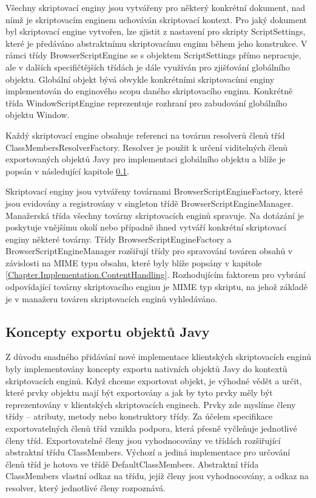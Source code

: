 Všechny skriptovací enginy jsou vytvářeny pro některý konkrétní dokument, nad nímž je skriptovacím enginem uchováván skriptovací kontext. Pro jaký dokument byl skriptovací engine vytvořen, lze zjistit z nastavení pro skripty ScriptSettings, které je předáváno abstraktnímu skriptovacímu enginu během jeho konstrukce. V rámci třídy BrowserScriptEngine se s objektem ScriptSettings přímo nepracuje, ale v dalších specifičtějších třídách je dále využíván pro zjišťování globálního objektu. Globální objekt bývá obvykle konkrétními skriptovacími enginy implementován do enginového scopu daného skriptovacího enginu. Konkrétně třída WindowScriptEngine reprezentuje rozhraní pro zabudování globálního objektu Window.

Každý skriptovací engine obsahuje referenci na továrnu resolverů členů tříd ClassMembersResolverFactory. Resolver je použit k určení viditelných členů exportovaných objektů Javy pro implementaci globálního objektu a blíže je popsán v následující kapitole \ref{Chapter.Implementation.ExportConcepts}. 

Skriptovací enginy jsou vytvářeny továrnami BrowserScriptEngineFactory, které jsou evidovány a registrovány v singleton třídě BrowserScriptEngineManager. Manažerská třída všechny továrny skriptovacích enginů spravuje. Na dotázání je poskytuje vnějšímu okolí nebo případně ihned vytváří konkrétní skriptovací enginy některé továrny. Třídy BrowserScriptEngineFactory a BrowserScriptEngineManager rozšiřují třídy pro spravování továren obsahů v závislosti na MIME typu obsahu, které byly blíže popsány v kapitole \ref{Chapter.Implementation.ContentHandling}. Rozhodujícím faktorem pro vybrání odpovídající továrny skriptovacího enginu je MIME typ skriptu, na jehož základě je v manažeru továren skriptovacích enginů vyhledáváno.

\subsection{Koncepty exportu objektů Javy}
\label{Chapter.Implementation.ExportConcepts}

Z důvodu snadného přidávání nové implementace klientských skriptovacích enginů byly implementovány koncepty exportu nativních objektů Javy do kontextů skriptovacích enginů. Když chceme exportovat objekt, je výhodné vědět a určit, které prvky objektu mají být exportovány a jak by tyto prvky měly být reprezentovány v klientských skriptovacích enginech. Prvky zde myslíme členy třídy -- atributy, metody nebo konstruktory třídy. Za účelem specifikace exportovatelných členů tříd vznikla podpora, která přesně vyčleňuje jednotlivé členy tříd. Exportovatelné členy jsou vyhodnocovány ve třídách rozšiřující abstraktní třídu ClassMembers. Výchozí a jediná implementace pro určování členů tříd je hotova ve třídě DefaultClassMembers. Abstraktní třída ClassMembers vlastní odkaz na třídu, jejíž členy jsou vyhodnocovány, a odkaz na resolver, který jednotlivé členy rozpoznává. 

